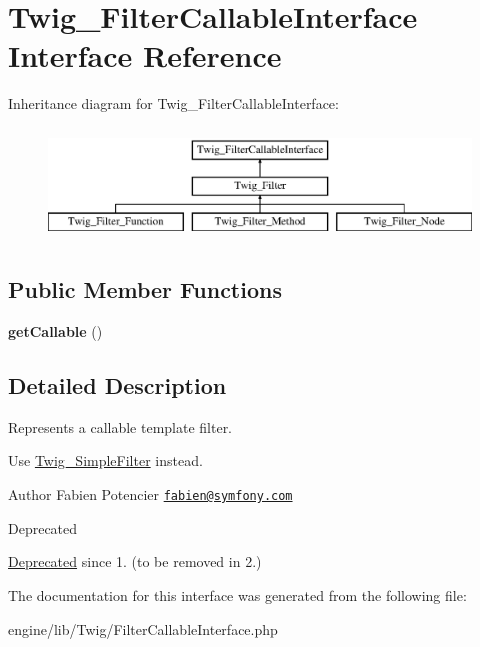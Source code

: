 \hypertarget{interface_twig___filter_callable_interface}{}\section{Twig\+\_\+\+Filter\+Callable\+Interface Interface Reference}
\label{interface_twig___filter_callable_interface}
Inheritance diagram for Twig\+\_\+\+Filter\+Callable\+Interface\+:\begin{figure}[H]
\begin{center}
\leavevmode
\includegraphics[height=3.000000cm]{interface_twig___filter_callable_interface}
\end{center}
\end{figure}
\subsection*{Public Member Functions}
\begin{DoxyCompactItemize}
\item 
\hypertarget{interface_twig___filter_callable_interface_a0be839e0782a38a172c386bd963375c9}{}{\bfseries get\+Callable} ()\label{interface_twig___filter_callable_interface_a0be839e0782a38a172c386bd963375c9}

\end{DoxyCompactItemize}


\subsection{Detailed Description}
Represents a callable template filter.

Use \hyperlink{class_twig___simple_filter}{Twig\+\_\+\+Simple\+Filter} instead.

\begin{DoxyAuthor}{Author}
Fabien Potencier \href{mailto:fabien@symfony.com}{\tt fabien@symfony.\+com} 
\end{DoxyAuthor}
\begin{DoxyRefDesc}{Deprecated}
\item[\hyperlink{deprecated__deprecated000008}{Deprecated}]since 1. (to be removed in 2.) \end{DoxyRefDesc}


The documentation for this interface was generated from the following file\+:\begin{DoxyCompactItemize}
\item 
engine/lib/\+Twig/Filter\+Callable\+Interface.\+php\end{DoxyCompactItemize}
